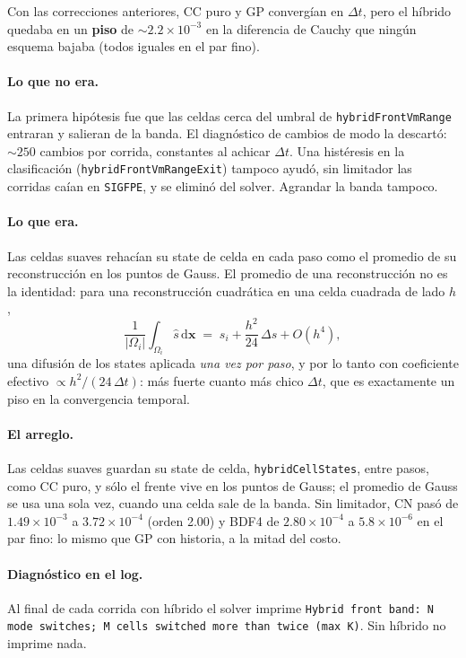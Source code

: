 \documentclass[11pt,a4paper]{article}
\newcommand{\code}[1]{\texttt{\small #1}}
\newcommand{\dictkey}[1]{\textcolor{black!60!green}{\texttt{\footnotesize #1}}}
\begin{document}
Con las correcciones anteriores, CC puro y GP convergían en $\Delta t$, pero el
híbrido quedaba en un \textbf{piso} de $\sim2.2\times10^{-3}$ en la diferencia de
Cauchy que ningún esquema bajaba (todos iguales en el par fino).

\paragraph{Lo que no era.} La primera hipótesis fue que las celdas cerca del
umbral de \dictkey{hybridFrontVmRange} entraran y salieran de la banda. El
diagnóstico de cambios de modo la descartó: $\sim250$ cambios por corrida,
constantes al achicar $\Delta t$. Una histéresis en la clasificación
(\code{hybridFrontVmRangeExit}) tampoco ayudó, sin limitador las corridas caían en
\code{SIGFPE}, y se eliminó del solver. Agrandar la banda tampoco.

\paragraph{Lo que era.} Las celdas suaves rehacían su state de celda en cada paso
como el promedio de su reconstrucción en los puntos de Gauss. El promedio de una
reconstrucción no es la identidad: para una reconstrucción cuadrática en una celda
cuadrada de lado $h$,
\begin{equation}
  \frac{1}{|\Omega_i|}\int_{\Omega_i}\widehat{s}\,\mathrm{d}\mathbf{x}
  \;=\; s_i + \frac{h^2}{24}\,\Delta s + O(h^4),
\end{equation}
una difusión de los states aplicada \emph{una vez por paso}, y por lo tanto con
coeficiente efectivo $\propto h^2/(24\,\Delta t)$: más fuerte cuanto más chico
$\Delta t$, que es exactamente un piso en la convergencia temporal.

\paragraph{El arreglo.} Las celdas suaves guardan su state de celda,
\code{hybridCellStates}, entre pasos, como CC puro, y sólo el frente vive en los
puntos de Gauss; el promedio de Gauss se usa una sola vez, cuando una celda sale
de la banda. Sin limitador, CN pasó de $1.49\times10^{-3}$ a
$3.72\times10^{-4}$ (orden 2.00) y BDF4 de $2.80\times10^{-4}$ a
$5.8\times10^{-6}$ en el par fino: lo mismo que GP con historia, a la mitad del
costo.

\paragraph{Diagnóstico en el log.} Al final de cada corrida con híbrido el solver
imprime \code{Hybrid front band: N mode switches; M cells switched more than twice
(max K)}. Sin híbrido no imprime nada.
\end{document}
